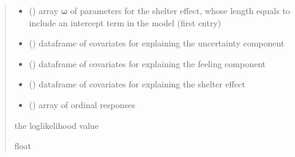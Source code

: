 \documentclass[letterpaper,10pt,english]{sphinxmanual}
\begin{document}
\begin{fulllineitems}
\begin{quote}
\begin{description}
\begin{itemize}
\item {} 
\sphinxAtStartPar
{} () \textendash{} array \(\pmb \omega\) of parameters for the shelter effect, whose length equals 
 to include an intercept term in the model (first entry)

\item {} 
\sphinxAtStartPar
{} () \textendash{} dataframe of covariates for explaining the uncertainty component

\item {} 
\sphinxAtStartPar
{} () \textendash{} dataframe of covariates for explaining the feeling component

\item {} 
\sphinxAtStartPar
{} () \textendash{} dataframe of covariates for explaining the shelter effect

\item {} 
\sphinxAtStartPar
{} () \textendash{} array of ordinal responses

\end{itemize}

\sphinxAtStartPar
the log\sphinxhyphen{}likelihood value

\sphinxAtStartPar
float

\end{description}\end{quote}

\end{fulllineitems}

\end{document}
